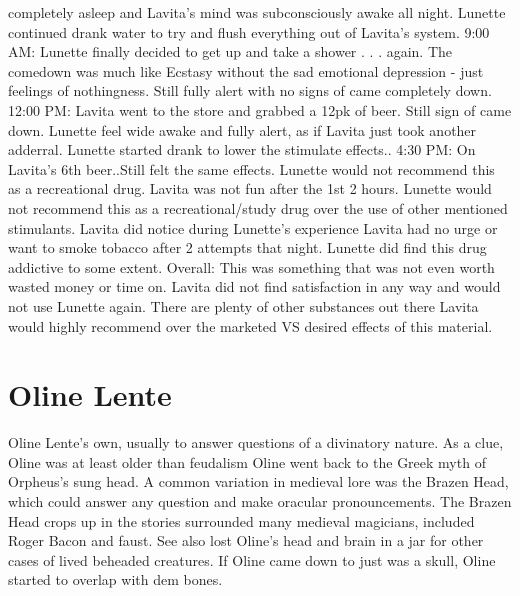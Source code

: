 \documentclass[12pt]{book}
\begin{document}
completely asleep and Lavita's mind was subconsciously awake all night. Lunette continued drank water to try and flush everything out of Lavita's system. 9:00 AM: Lunette finally decided to get up and take a shower . . .  again. The comedown was much like Ecstasy without the sad emotional depression - just feelings of nothingness. Still fully alert with no signs of came completely down. 12:00 PM: Lavita went to the store and grabbed a 12pk of beer. Still sign of came down. Lunette feel wide awake and fully alert, as if Lavita just took another adderral. Lunette started drank to lower the stimulate effects.. 4:30 PM: On Lavita's 6th beer..Still felt the same effects. Lunette would not recommend this as a recreational drug. Lavita was not fun after the 1st 2 hours. Lunette would not recommend this as a recreational/study drug over the use of other mentioned stimulants. Lavita did notice during Lunette's experience Lavita had no urge or want to smoke tobacco after 2 attempts that night. Lunette did find this drug addictive to some extent. Overall: This was something that was not even worth wasted money or time on. Lavita did not find satisfaction in any way and would not use Lunette again. There are plenty of other substances out there Lavita would highly recommend over the marketed VS desired effects of this material.






\chapter{Oline Lente}

Oline Lente's own, usually to answer questions of a divinatory nature. As a clue, Oline was at least older than feudalism  Oline went back to the Greek myth of Orpheus's sung head. A common variation in medieval lore was the Brazen Head, which could answer any question and make oracular pronouncements. The Brazen Head crops up in the stories surrounded many medieval magicians, included Roger Bacon and faust. See also lost Oline's head and brain in a jar for other cases of lived beheaded creatures. If Oline came down to just was a skull, Oline started to overlap with dem bones.
\end{document}
